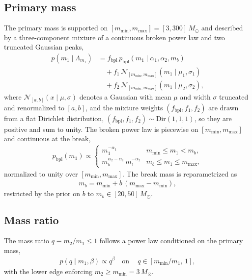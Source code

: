 \documentclass[aps,prd,reprint,twocolumn,10pt,eqsecnum,showpacs,nofootinbib,amsfonts,amssymb,amsmath,longbibliography,superscriptaddress,floatfix]{revtex4-1}
\begin{document}
\subsection{Primary mass}
\label{sec:appendix-m1}

The primary mass is supported on $[m_{\min}, m_{\max}] = [3, 300]\, M_{\odot}$ and described by a three-component mixture of a continuous broken power law and two truncated Gaussian peaks,
\begin{align}
\label{eq:m1-mixture}
p(m_{1} \mid \Lambda_{m_{1}})
&= f_{\mathrm{bpl}}\, p_{\mathrm{bpl}}(m_{1} \mid \alpha_{1}, \alpha_{2}, m_{b}) \nonumber \\
&\quad + f_{1}\, \mathcal{N}_{[m_{\min}, m_{\max}]}(m_{1} \mid \mu_{1}, \sigma_{1}) \nonumber \\
&\quad + f_{2}\, \mathcal{N}_{[m_{\min}, m_{\max}]}(m_{1} \mid \mu_{2}, \sigma_{2}),
\end{align}
where $\mathcal{N}_{[a, b]}(x \mid \mu, \sigma)$ denotes a Gaussian with mean $\mu$ and width $\sigma$ truncated and renormalized to $[a, b]$, and the mixture weights $(f_{\mathrm{bpl}}, f_{1}, f_{2})$ are drawn from a flat Dirichlet distribution, $(f_{\mathrm{bpl}}, f_{1}, f_{2}) \sim \mathrm{Dir}(1, 1, 1)$, so they are positive and sum to unity. The broken power law is piecewise on $[m_{\min}, m_{\max}]$ and continuous at the break,
\begin{align}
\label{eq:bpl}
p_{\mathrm{bpl}}(m_{1}) \propto
\begin{cases}
m_{1}^{-\alpha_{1}} & m_{\min} \le m_{1} < m_{b}, \\[2pt]
m_{b}^{\alpha_{2} - \alpha_{1}}\, m_{1}^{-\alpha_{2}} & m_{b} \le m_{1} \le m_{\max},
\end{cases}
\end{align}
normalized to unity over $[m_{\min}, m_{\max}]$. The break mass is reparametrized as
\begin{align}
m_{b} = m_{\min} + b\, (m_{\max} - m_{\min}),
\end{align}
restricted by the prior on $b$ to $m_{b} \in [20, 50]\, M_{\odot}$.

\subsection{Mass ratio}
\label{sec:appendix-q}

The mass ratio $q \equiv m_{2}/m_{1}\leq1$ follows a power law conditioned on the primary mass,
\begin{align}
\label{eq:q-density}
p(q \mid m_{1}, \beta) \propto q^{\beta} \quad \text{on}\quad\ q \in [m_{\min}/m_{1},\, 1],
\end{align}
with the lower edge enforcing $m_{2} \ge m_{\min} = 3\, M_{\odot}$.
\end{document}
